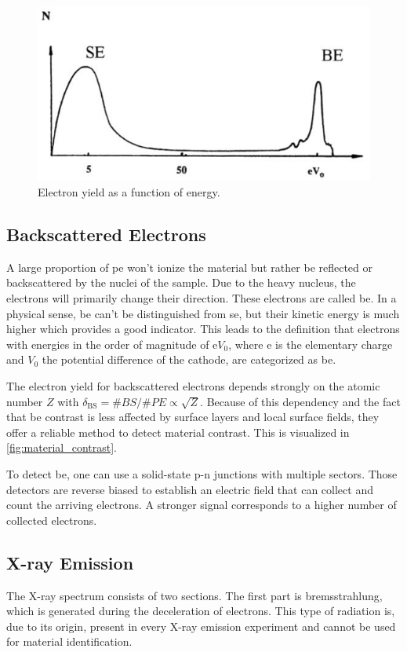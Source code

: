 \begin{figure}
	\centering
	\includegraphics[width=0.95\linewidth]{../assets/elektronen.png}
	\caption{Electron yield as a function of energy. }
	\label{fig:electrons}
\end{figure}

\subsection{Backscattered Electrons}
A large proportion of \ac{pe} won't ionize the material but
rather be reflected or backscattered by the nuclei of the sample.
Due to the heavy nucleus, the electrons will primarily change their
direction.
These electrons are called \ac{be}. In a physical sense, \ac{be} can't be
distinguished from \ac{se}, but their kinetic energy is much higher
which provides a good indicator.
This leads to the definition that electrons with energies in the order
of magnitude of $\mathrm{e} V_0$, where $\mathrm{e}$ is the elementary
charge and $V_0$ the potential difference of the cathode, are
categorized as \ac{be}.

The electron yield for backscattered electrons depends strongly on
the atomic number $Z$ with $\delta_\text{BS} = \# BS / \# PE
	\propto \sqrt{Z}$.
Because of this dependency and the fact that \ac{be}
contrast is less affected by surface layers and local surface fields,
they offer a reliable
method to detect material contrast.
This is visualized in \cref{fig:material_contrast}.

To detect \ac{be}, one can use a solid-state p-n
junctions with multiple sectors.
Those detectors are reverse biased to establish an electric field that
can collect and count the arriving electrons.
A stronger signal corresponds to a higher number of collected electrons.

\subsection{X-ray Emission}
The X-ray spectrum consists of two sections.
The first part is bremsstrahlung, which is generated during the
deceleration of electrons.
This type of radiation is, due to its origin, present in every X-ray
emission experiment and cannot be used for material identification.


